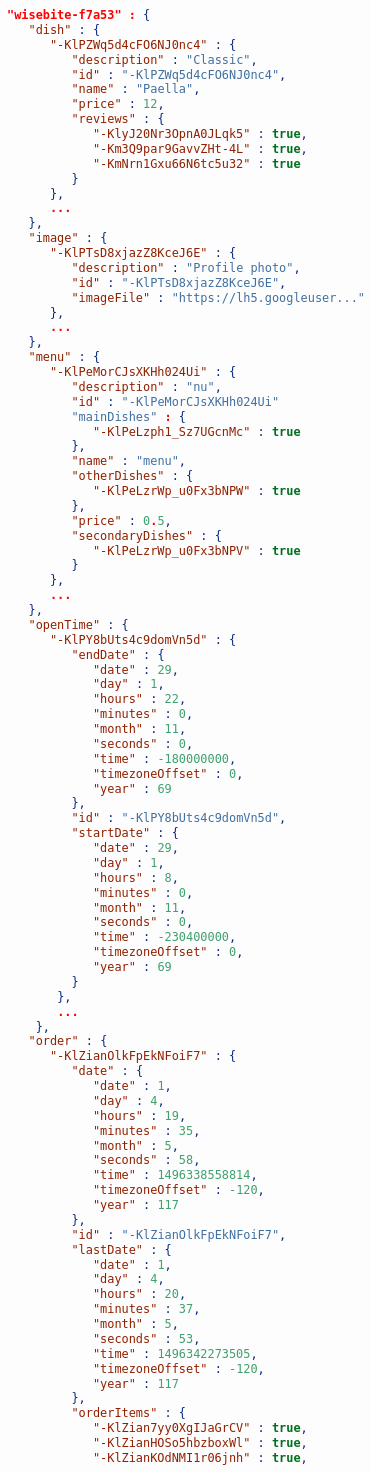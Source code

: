 \clearpage
\begin{lstlisting}[language=json,firstnumber=1]
"wisebite-f7a53" : {
   "dish" : {
      "-KlPZWq5d4cFO6NJ0nc4" : {
         "description" : "Classic",
         "id" : "-KlPZWq5d4cFO6NJ0nc4",
         "name" : "Paella",
         "price" : 12,
         "reviews" : {
            "-KlyJ20Nr3OpnA0JLqk5" : true,
            "-Km3Q9par9GavvZHt-4L" : true,
            "-KmNrn1Gxu66N6tc5u32" : true
         }
      },
      ...
   },
   "image" : {
      "-KlPTsD8xjazZ8KceJ6E" : {
         "description" : "Profile photo",
         "id" : "-KlPTsD8xjazZ8KceJ6E",
         "imageFile" : "https://lh5.googleuser..."
      },
      ...
   },
   "menu" : {
      "-KlPeMorCJsXKHh024Ui" : {
         "description" : "nu",
         "id" : "-KlPeMorCJsXKHh024Ui"
         "mainDishes" : {
            "-KlPeLzph1_Sz7UGcnMc" : true
         },
         "name" : "menu",
         "otherDishes" : {
            "-KlPeLzrWp_u0Fx3bNPW" : true
         },
         "price" : 0.5,
         "secondaryDishes" : {
            "-KlPeLzrWp_u0Fx3bNPV" : true
         }
      },
      ...
   },
   "openTime" : {
      "-KlPY8bUts4c9domVn5d" : {
         "endDate" : {
            "date" : 29,
            "day" : 1,
            "hours" : 22,
            "minutes" : 0,
            "month" : 11,
            "seconds" : 0,
            "time" : -180000000,
            "timezoneOffset" : 0,
            "year" : 69
         },
         "id" : "-KlPY8bUts4c9domVn5d",
         "startDate" : {
            "date" : 29,
            "day" : 1,
            "hours" : 8,
            "minutes" : 0,
            "month" : 11,
            "seconds" : 0,
            "time" : -230400000,
            "timezoneOffset" : 0,
            "year" : 69
         }
       },
       ...
    },
   "order" : {
      "-KlZianOlkFpEkNFoiF7" : {
         "date" : {
            "date" : 1,
            "day" : 4,
            "hours" : 19,
            "minutes" : 35,
            "month" : 5,
            "seconds" : 58,
            "time" : 1496338558814,
            "timezoneOffset" : -120,
            "year" : 117
         },
         "id" : "-KlZianOlkFpEkNFoiF7",
         "lastDate" : {
            "date" : 1,
            "day" : 4,
            "hours" : 20,
            "minutes" : 37,
            "month" : 5,
            "seconds" : 53,
            "time" : 1496342273505,
            "timezoneOffset" : -120,
            "year" : 117
         },
         "orderItems" : {
            "-KlZian7yy0XgIJaGrCV" : true,
            "-KlZianHOSo5hbzboxWl" : true,
            "-KlZianKOdNMI1r06jnh" : true,

\end{lstlisting}
